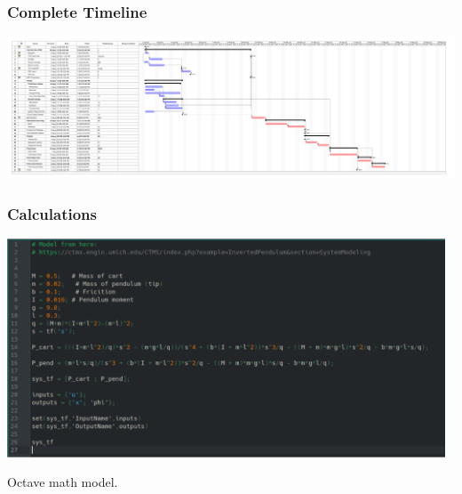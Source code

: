 \documentclass[aspectratio=169]{beamer}
\begin{document}
\begin{frame}
    \frametitle{Complete Timeline}

    \includegraphics[width=15cm]{project}
\end{frame}

\begin{frame}
    \frametitle{Calculations}

    \includegraphics[height=6.5cm]{Calculations}

    Octave math model.
\end{frame}
\end{document}

